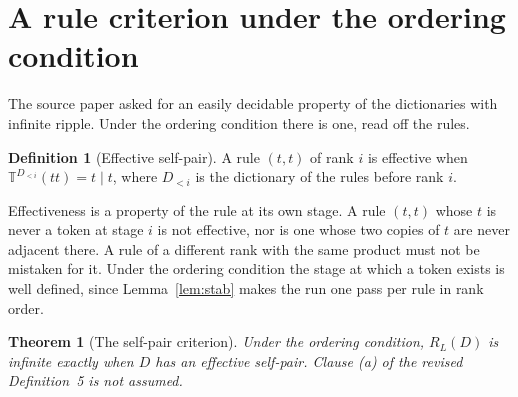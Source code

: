 \documentclass[11pt,a4paper]{article}
\theoremstyle{definition}
\newtheorem{definition}{Definition}
\theoremstyle{plain}
\newtheorem{theorem}{Theorem}
\newcommand{\T}{\mathbb{T}}
\newcommand{\ripple}{R_{L}}
\begin{document}
\section{A rule criterion under the ordering condition}\label{sec:criterion}

The source paper asked for an easily decidable property of the dictionaries with infinite ripple. Under the ordering
condition there is one, read off the rules.


\begin{definition}[Effective self-pair]\label{def:selfpair}
A rule \((t, t)\) of rank \(i\) is effective when \(\T^{D_{<i}}(tt) = t \mid t\), where \(D_{<i}\) is the dictionary of
the rules before rank \(i\).
\end{definition}

Effectiveness is a property of the rule at its own stage. A rule \((t, t)\) whose \(t\) is never a token at stage \(i\)
is not effective, nor is one whose two copies of \(t\) are never adjacent there. A rule of a different rank with the
same product must not be mistaken for it. Under the ordering condition the stage at which a token exists is well
defined, since Lemma~\ref{lem:stab} makes the run one pass per rule in rank order.

\begin{theorem}[The self-pair criterion]\label{thm:selfpair}
Under the ordering condition, \(\ripple(D)\) is infinite exactly when \(D\) has an effective self-pair. Clause (a) of
the revised Definition~5 is not assumed.
\end{theorem}
\end{document}
